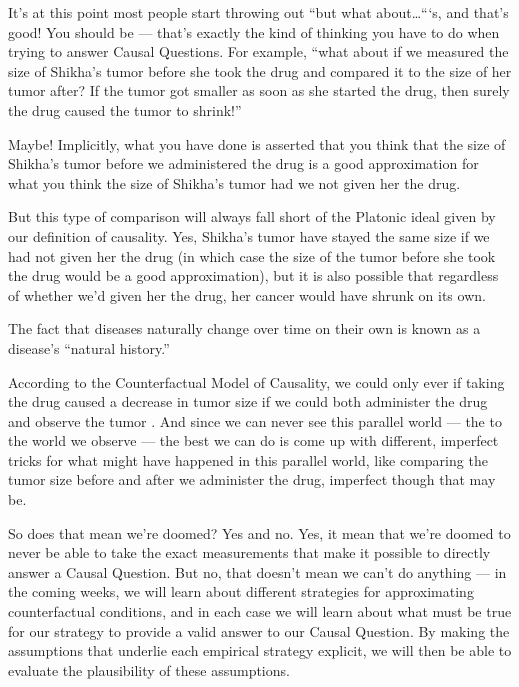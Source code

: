 \documentclass[letterpaper,10pt,english]{jupyterBook}
\begin{document}
\sphinxAtStartPar
It’s at this point most people start throwing out “but what about…“‘s, and that’s good! You should be — that’s exactly the kind of thinking you have to do when trying to answer Causal Questions. For example, “what about if we measured the size of Shikha’s tumor before she took the drug and compared it to the size of her tumor after? If the tumor got smaller as soon as she started the drug, then surely the drug caused the tumor to shrink!”

\sphinxAtStartPar
Maybe! Implicitly, what you have done is asserted that you think that the size of Shikha’s tumor before we administered the drug is a good approximation for what you think the size of Shikha’s tumor  had we not given her the drug.

\sphinxAtStartPar
But this type of comparison will always fall short of the Platonic ideal given by our definition of causality. Yes, Shikha’s tumor  have stayed the same size if we had not given her the drug (in which case the size of the tumor before she took the drug would be a good approximation), but it is also possible that regardless of whether we’d given her the drug, her cancer would have shrunk on its own.%
\begin{footnote}[1]\sphinxAtStartFootnote
The fact that diseases naturally change over time on their own is known as a disease’s “natural history.”
%
\end{footnote}

\sphinxAtStartPar
According to the Counterfactual Model of Causality, we could only ever  if taking the drug caused a decrease in tumor size if we could both administer the drug and observe the tumor . And since we can never see this parallel world — the  to the world we observe — the best we can do is come up with different, imperfect tricks for  what might have happened in this parallel world, like comparing the tumor size before and after we administer the drug, imperfect though that may be.

\sphinxAtStartPar
So does that mean we’re doomed? Yes and no. Yes, it  mean that we’re doomed to never be able to take the exact measurements that make it possible to directly answer a Causal Question. But no, that doesn’t mean we can’t do anything — in the coming weeks, we will learn about different strategies for approximating counterfactual conditions, and in each case we will learn about what  must be true for our strategy to provide a valid answer to our Causal Question. By making the assumptions that underlie each empirical strategy explicit, we will then be able to evaluate the plausibility of these assumptions.
\end{document}
